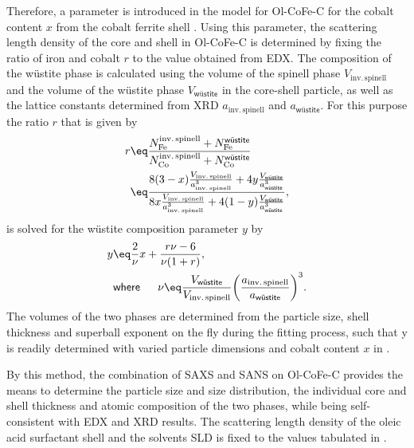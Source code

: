 \documentclass[\main/dresen_thesis.tex]{subfiles}
\begin{document}
    Therefore, a parameter is introduced in the model for Ol-CoFe-C for the cobalt content $x$ from the cobalt ferrite shell .
    Using this parameter, the scattering length density of the core and shell in Ol-CoFe-C is determined by fixing the ratio of iron and cobalt $r$ to the value obtained from EDX.
    The composition of the w\"ustite phase  is calculated using the volume of the spinell phase $V_\mathrm{inv.\,spinell}$ and the volume of the w\"ustite phase $V_\textsf{w\"ustite}$ in the core-shell particle, as well as the lattice constants determined from XRD $a_\mathrm{inv.\,spinell}$ and $a_\textsf{w\"ustite}$.
    For this purpose the ratio $r$ that is given by
    \begin{align}
      \begin{split}
        r &\eq \frac{N_\mathrm{Fe}^\mathrm{inv.\, spinell} + N_\mathrm{Fe}^\textsf{w\"ustite}}
                    {N_\mathrm{Co}^\mathrm{inv.\, spinell} + N_\mathrm{Co}^\textsf{w\"ustite}} \\
          &\eq \frac
                 {8 (3-x) \frac{V_\mathrm{inv.\,spinell}}{a_\mathrm{inv.\,spinell}^3} +
                  4 y \frac{V_\textsf{w\"ustite}}{a_\textsf{w\"ustite}^3}}
                 {8 x \frac{V_\mathrm{inv.\,spinell}}{a_\mathrm{inv.\,spinell}^3} +
                  4 (1-y) \frac{V_\textsf{w\"ustite}}{a_\textsf{w\"ustite}^3}},
      \end{split}
    \end{align}
    is solved for the w\"ustite composition parameter $y$ by
    \begin{align}
      y &\eq \frac{2}{\nu} x + \frac{r \nu - 6}{\nu (1 + r)},\\
        & \textsf{where\,} \hspace{0.5cm} \nu \eq \frac{V_\textsf{w\"ustite}}{V_\mathrm{inv.\,spinell}} \biggl( \frac{a_\mathrm{inv.\,spinell}}{a_\textsf{w\"ustite}} \biggr)^3.
    \end{align}
    The volumes of the two phases are determined from the particle size, shell thickness and superball exponent on the fly during the fitting process, such that y is readily determined with varied particle dimensions and cobalt content $x$ in .

    By this method, the combination of SAXS and SANS on Ol-CoFe-C provides the means to determine the particle size and size distribution, the individual core and shell thickness and atomic composition of the two phases, while being self-consistent with EDX and XRD results.
    The scattering length density of the oleic acid surfactant shell and the solvents SLD is fixed to the values tabulated in .
\end{document}

